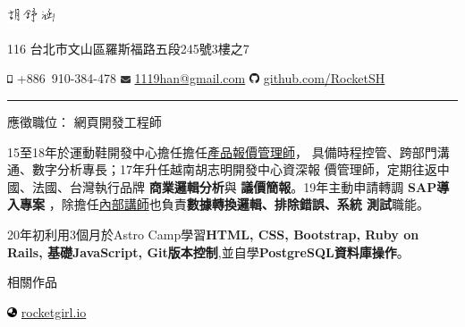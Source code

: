 \documentclass[a4paper,10pt]{article}
\begin{document}
\frenchspacing

\begin{center} 
  \Huge{\includegraphics[height=1.3em,trim=0 10mm 0 -1cm]{shared/signature.png}}\par
  \normalsize {116 台北市文山區羅斯福路五段245號3樓之7}

  \includegraphics[height=0.7em]{shared/mobile-alt.eps} +886~910-384-478 \md
  \includegraphics[width=0.8em]{shared/envelope.eps}
  \href{mailto:1119han@gmail.com}{1119han@gmail.com} \md
  \includegraphics[width=0.8em]{shared/github.eps}
  \href{https://github.com/RocketSH}{github.com/RocketSH}
\end{center}

\rule{15.2cm}{0.05em}

\vspace*{1em}
\begin{center}
  \large{應徵職位： 網頁開發工程師}
\end{center}
\vspace*{1em}

\begin{center}
  \begin{minipage}{0.9\textwidth}
    15至18年於運動鞋開發中心擔任擔任\underline{產品報價管理師}，
        具備時程控管、跨部門溝通、數字分析專長；17年升任越南胡志明開發中心資深報
        價管理師，定期往返中國、法國、台灣執行品牌 \textbf{商業邏輯分析}與
        \textbf{議價簡報}。19年主動申請轉調 \textbf{SAP導入專案}
        ，除擔任\underline{內部講師}也負責\textbf{數據轉換邏輯、排除錯誤、系統
          測試}職能。

        \vspace*{1em}
        20年初利用3個月於Astro Camp學習\textbf{HTML, CSS, Bootstrap, Ruby on
          Rails, 基礎JavaScript, Git版本控制},並自學\textbf{PostgreSQL資料庫操作}。
  \end{minipage}
\end{center}

\vspace*{1em}
\begin{center}
  \large{相關作品}
\end{center}
\hspace*{1em}
\includegraphics[width=0.8em]{shared/globe-asia.eps}
\href{https://rocketgirl.io/}{rocketgirl.io}
\end{document}
